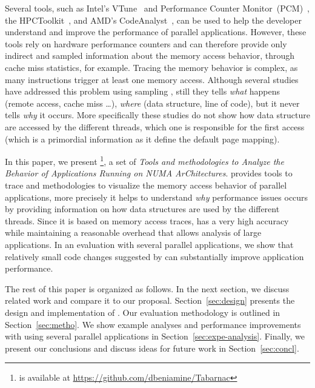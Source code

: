 Several tools, such as Intel's VTune~\cite{Reinders05VTune} and Performance Counter Monitor~(PCM)~\cite{Intel2012b}, the HPCToolkit~\cite{Adhianto10HPCTOOLKIT}, and AMD's CodeAnalyst~\cite{Drongowski2008}, can be used to help the
developer understand and improve the performance of parallel applications.
However, these tools rely on hardware performance counters and can therefore provide only indirect and sampled information about the memory access behavior, through cache miss statistics, for example.
Tracing the memory behavior is complex, as many instructions trigger at least one memory access.
Although several studies have addressed this problem using sampling
\cite{Lachaize12MemProf,McCurdy2010,Gimenez14Dissecting},
still they tells \emph{what} happens (remote access, cache miss \ldots),
\emph{where} (data structure, line of code), but it never tells \emph{why} it
occurs. More specifically these studies do not show how data structure are
accessed by the different threads, which one is responsible for the first
access (which is a primordial information as it define the default page
mapping).

In this paper, we present \TABARNAC\footnote{\TABARNAC is available at
    \url{https://github.com/dbeniamine/Tabarnac}}, a set of \emph{Tools and
    methodologies to Analyze the Behavior of
Applications Running on NUMA ArChitectures}. \TABARNAC provides tools to trace
and methodologies to visualize the memory access behavior of parallel
applications, more precisely it helps to understand \emph{why} performance
issues occurs by providing information on how data structures are used by the
different threads.
Since it is based on memory access traces, \TABARNAC has a very high accuracy while maintaining a reasonable overhead that allows analysis of large applications.
In an evaluation with several parallel applications, we show that relatively small code changes suggested by \TABARNAC can substantially improve application performance.

The rest of this paper is organized as follows.
In the next section, we discuss related work and compare it to our proposal.
Section~\ref{sec:design} presents the design and implementation of \TABARNAC.
Our evaluation methodology is outlined in Section~\ref{sec:metho}.
We show example analyses and performance improvements with \TABARNAC using several parallel applications in Section~\ref{sec:expe-analysis}.
Finally, we present our conclusions and discuss ideas for future work in Section~\ref{sec:concl}.
